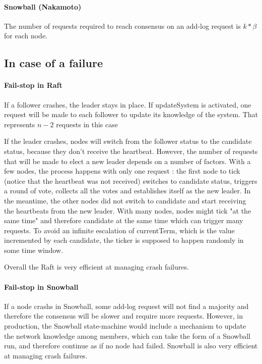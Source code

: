 \documentclass[11pt, twocolumn]{article}
\begin{document}
\paragraph{Snowball (Nakamoto)}
The number of requests required to reach consensus on an add-log request is $k*\beta$ for each node.

\subsection{In case of a failure}
\paragraph{Fail-stop in Raft}
If a follower crashes, the leader stays in place. If updateSystem is activated, one request will be made to each follower to update its knowledge of the system. That represents $n-2$ requests in this case

If the leader crashes, nodes will switch from the follower status to the candidate status, because they don't receive the heartbeat.
However, the number of requests that will be made to elect a new leader depends on a number of factors.
With a few nodes, the process happens with only one request : the first node to tick (notice that the heartbeat was not received) switches to candidate status, triggers a round of vote, collects all the votes and establishes itself as the new leader.
In the meantime, the other nodes did not switch to candidate and start receiving the heartbeats from the new leader.
With many nodes, nodes might tick "at the same time" and therefore candidate at the same time which can trigger many requests. To avoid an infinite escalation of currentTerm, which is the value incremented by each candidate, the ticker is supposed to happen randomly in some time window.

Overall the Raft is very efficient at managing crash failures.

\paragraph{Fail-stop in Snowball}
If a node crashs in Snowball, some add-log request will not find a majority and therefore the consensus will be slower and require more requests.
However, in production, the Snowball state-machine would include a mechanism to update the network knowledge among members, which can take the form of a Snowball run, and therefore continue as if no node had failed.
Snowball is also very efficient at managing crash failures.
\end{document}
